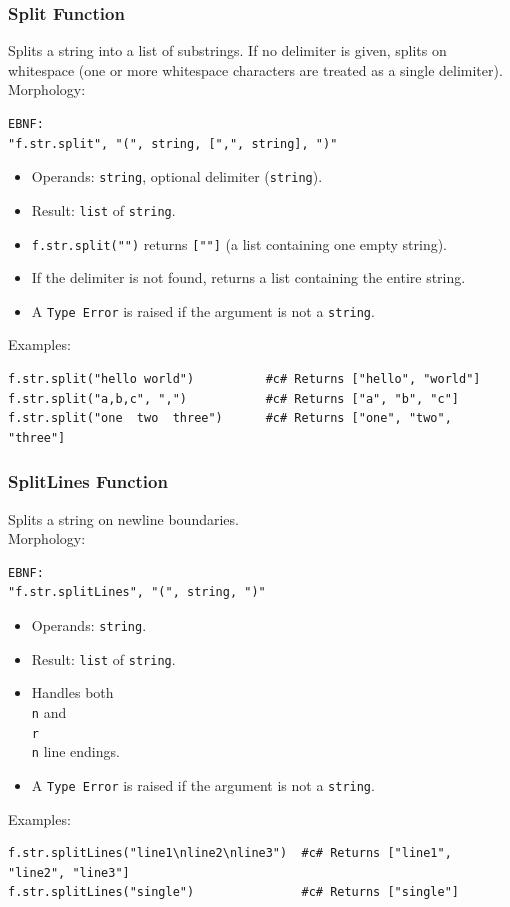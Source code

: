 \subsubsection{Split Function}
Splits a string into a list of substrings. If no delimiter is given, splits on whitespace (one or more whitespace characters are treated as a single delimiter). \\
Morphology:
\begin{verbatim}
EBNF:
"f.str.split", "(", string, [",", string], ")"
\end{verbatim}
\begin{itemize}
\item Operands: \texttt{string}, optional delimiter (\texttt{string}).
\item Result: \texttt{list} of \texttt{string}.
\item \texttt{f.str.split("")} returns \texttt{[""]} (a list containing one empty string).
\item If the delimiter is not found, returns a list containing the entire string.
\item A \texttt{Type Error} is raised if the argument is not a \texttt{string}.
\end{itemize}
Examples:
\begin{verbatim}
f.str.split("hello world")          #c# Returns ["hello", "world"]
f.str.split("a,b,c", ",")           #c# Returns ["a", "b", "c"]
f.str.split("one  two  three")      #c# Returns ["one", "two", "three"]
\end{verbatim}

\subsubsection{SplitLines Function}
Splits a string on newline boundaries. \\
Morphology:
\begin{verbatim}
EBNF:
"f.str.splitLines", "(", string, ")"
\end{verbatim}
\begin{itemize}
\item Operands: \texttt{string}.
\item Result: \texttt{list} of \texttt{string}.
\item Handles both \texttt{\\n} and \texttt{\\r\\n} line endings.
\item A \texttt{Type Error} is raised if the argument is not a \texttt{string}.
\end{itemize}
Examples:
\begin{verbatim}
f.str.splitLines("line1\nline2\nline3")  #c# Returns ["line1", "line2", "line3"]
f.str.splitLines("single")               #c# Returns ["single"]
\end{verbatim}

